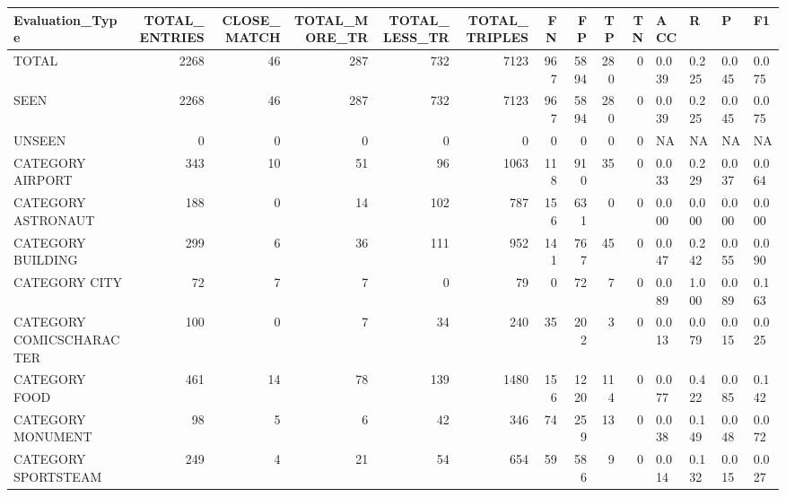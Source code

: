 \begin{tabular}{lrrrrrrrrrllll}
\hline
 Evaluation\_Type          &   TOTAL\_ENTRIES &   CLOSE\_MATCH &   TOTAL\_MORE\_TR &   TOTAL\_LESS\_TR &   TOTAL\_TRIPLES &   FN &   FP &   TP &   TN & ACC   & R     & P     & F1    \\
\hline
 TOTAL                    &            2268 &            46 &             287 &             732 &            7123 &  967 & 5894 &  280 &    0 & 0.039 & 0.225 & 0.045 & 0.075 \\
 SEEN                     &            2268 &            46 &             287 &             732 &            7123 &  967 & 5894 &  280 &    0 & 0.039 & 0.225 & 0.045 & 0.075 \\
 UNSEEN                   &               0 &             0 &               0 &               0 &               0 &    0 &    0 &    0 &    0 & NA    & NA    & NA    & NA    \\
 CATEGORY AIRPORT         &             343 &            10 &              51 &              96 &            1063 &  118 &  910 &   35 &    0 & 0.033 & 0.229 & 0.037 & 0.064 \\
 CATEGORY ASTRONAUT       &             188 &             0 &              14 &             102 &             787 &  156 &  631 &    0 &    0 & 0.000 & 0.000 & 0.000 & 0.000 \\
 CATEGORY BUILDING        &             299 &             6 &              36 &             111 &             952 &  141 &  767 &   45 &    0 & 0.047 & 0.242 & 0.055 & 0.090 \\
 CATEGORY CITY            &              72 &             7 &               7 &               0 &              79 &    0 &   72 &    7 &    0 & 0.089 & 1.000 & 0.089 & 0.163 \\
 CATEGORY COMICSCHARACTER &             100 &             0 &               7 &              34 &             240 &   35 &  202 &    3 &    0 & 0.013 & 0.079 & 0.015 & 0.025 \\
 CATEGORY FOOD            &             461 &            14 &              78 &             139 &            1480 &  156 & 1220 &  114 &    0 & 0.077 & 0.422 & 0.085 & 0.142 \\
 CATEGORY MONUMENT        &              98 &             5 &               6 &              42 &             346 &   74 &  259 &   13 &    0 & 0.038 & 0.149 & 0.048 & 0.072 \\
 CATEGORY SPORTSTEAM      &             249 &             4 &              21 &              54 &             654 &   59 &  586 &    9 &    0 & 0.014 & 0.132 & 0.015 & 0.027 \\

\end{tabular}
